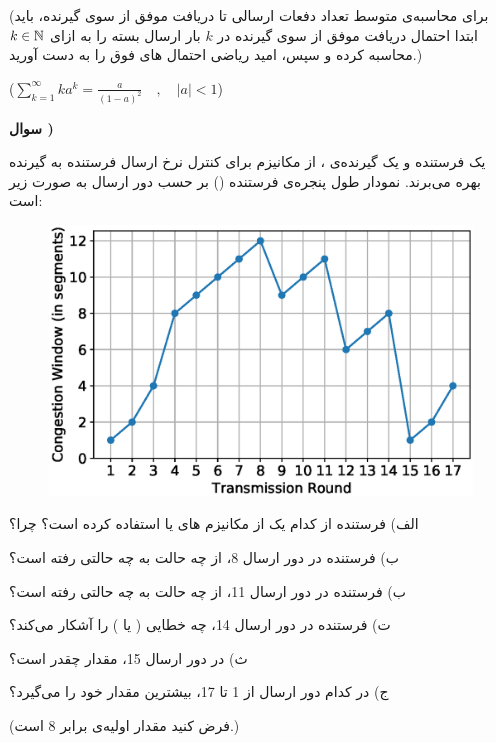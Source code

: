 \documentclass{article}
\newcounter{questionnumber}
\newcommand{\Q}{
\textbf{سوال \thequestionnumber)}
\stepcounter{questionnumber}
}
\begin{document}
(برای محاسبه‌ی متوسط تعداد دفعات ارسالی تا دریافت موفق  از سوی گیرنده، باید ابتدا احتمال دریافت موفق  از سوی گیرنده در $k$ بار ارسال بسته را به ازای $k\in\Bbb N$ محاسبه کرده و سپس، امید ریاضی احتمال های فوق را به دست آورید.)

($\sum_{k=1}^\infty ka^k=\frac{a}{(1-a)^2}\quad , \quad |a|<1$)

\newpage
\Q

یک فرستنده و یک گیرنده‌ی  ، از مکانیزم  برای کنترل نرخ ارسال فرستنده به گیرنده بهره می‌برند. نمودار طول پنجره‌ی فرستنده () بر حسب دور ارسال به صورت زیر است:
\begin{figure}[h]
\centering
\includegraphics[width=120mm]{Q4.eps}
\end{figure}

الف) فرستنده از کدام یک از مکانیزم های  یا  استفاده کرده است؟ چرا؟

ب) فرستنده در دور ارسال 8، از چه حالت به چه حالتی رفته است؟

ب) فرستنده در دور ارسال 11، از چه حالت به چه حالتی رفته است؟

ت) فرستنده در دور ارسال 14، چه خطایی ( یا ) را آشکار می‌کند؟

ث) در دور ارسال 15، مقدار  چقدر است؟

ج) در کدام دور ارسال از 1 تا 17،  بیشترین مقدار خود را می‌گیرد؟

(فرض کنید مقدار اولیه‌ی  برابر 8 است.)
\end{document}
